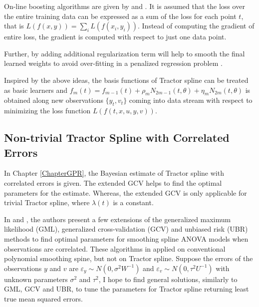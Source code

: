 On-line boosting algorithms are given by \cite{babenko2009family} and \cite{beygelzimer2015online}. It is assumed that the loss over the entire training data can be expressed as a sum of the loss for each point $t$, that is $L(f(x,y))=\sum_i L(f(x_i,y_i))$. Instead of computing the gradient of entire
loss, the gradient is computed with respect to just one data point. 

Further, by adding additional regularization term will help to smooth the final learned weights to avoid over-fitting in a penalized regression problem \cite{chen2016xgboost}. 

Inspired by the above ideas, the basis functions of Tractor spline can be treated as basic learners and $f_m(t)=f_{m-1}(t)+\rho_m N_{2m-1}(t,\theta)+\eta_mN_{2m}(t,\theta)$ is obtained along new observations $\{y_t,v_t\}$ coming into data stream with respect to minimizing the loss function $L(f(t,x,u,y,v))$. 



%



\subsection*{Non-trivial Tractor Spline with Correlated Errors}

In Chapter \ref{ChapterGPR}, the Bayesian estimate of Tractor spline with correlated errors is given. The extended GCV helps to find the optimal parameters for the estimate. Whereas, the extended GCV is only applicable for trivial Tractor spline, where $\lambda(t)$ is a constant. 


In \cite{opsomer2001nonparametric} and \cite{wang1998smoothing}, the authors present a few extensions of the generalized maximum likelihood (GML), generalized cross-validation (GCV) and unbiased risk (UBR) methods to find optimal parameters for smoothing spline ANOVA models when observations are correlated. These algorithms in applied on conventional polynomial smoothing spine, but not on Tractor spline. Suppose the errors of the observations $y$ and $v$ are $\varepsilon_y\sim N(0,\sigma^2W^{-1})$ and $\varepsilon_v\sim N(0,\tau^2U^{-1})$ with unknown parameters $\sigma^2$ and $\tau^2$, I hope to find general solutions, similarly to GML, GCV and UBR, to tune the parameters for Tractor spline returning least true mean squared errors. 




